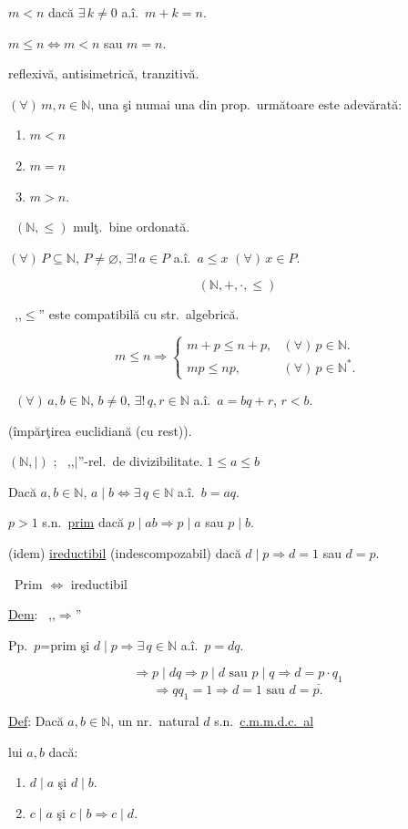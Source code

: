\documentclass[12pt]{article}
\begin{document}
\noindent $m<n$ dacă $\exists\, k\neq 0$ a.î.\ $m+k=n$.

\noindent $m\leq n \Longleftrightarrow m<n$ sau $m=n$.

\noindent reflexivă, antisimetrică, tranzitivă.

\bigskip
\noindent $(\forall)\,m,n\in\mathbb{N}$, una şi numai una din prop.\ următoare este adevărată:

\begin{enumerate}
\item[(1)] $m<n$
\item[(2)] $m=n$
\item[(3)] $m>n$.
\end{enumerate}

\bigskip
\noindent{} \ $(\mathbb{N},\leq)$ mulţ.\ bine ordonată.

\noindent $(\forall)\,P\subseteq\mathbb{N}$, $P\neq\varnothing$, $\exists!\,a\in P$ a.î.\ $a\leq x$ $(\forall)\,x\in P$.

\[
(\mathbb{N},+,\cdot,\leq)
\]

\bigskip
\noindent{} \ ,,$\leq$'' este compatibilă cu str.\ algebrică.

\[
m\leq n \Rightarrow
\begin{cases}
m+p\leq n+p, & (\forall)\,p\in\mathbb{N}.\\
mp\leq np, & (\forall)\,p\in\mathbb{N}^*.
\end{cases}
\]

\bigskip
\noindent{} \ $(\forall)\,a,b\in\mathbb{N}$, $b\neq 0$, $\exists!\,q,r\in\mathbb{N}$ a.î.\ $a=bq+r$, $r<b$.

\noindent (împărţirea euclidiană (cu rest)).

\bigskip
\noindent $(\mathbb{N},\mid)$ ; \ ,,$\mid$''-rel.\ de divizibilitate. \hfill $1\leq a\leq b$

\noindent Dacă $a,b\in\mathbb{N}$, $a\mid b \Leftrightarrow \exists\,q\in\mathbb{N}$ a.î.\ $b=aq$.

\bigskip
\noindent $p>1$ s.n.\ \underline{prim} dacă $p\mid ab \Rightarrow p\mid a$ sau $p\mid b$.

\noindent (idem) \underline{ireductibil} (indescompozabil) dacă $d\mid p \Rightarrow d=1$ sau $d=p$.

\bigskip
\noindent{} \ Prim $\Leftrightarrow$ ireductibil

\bigskip
\noindent\underline{Dem}: \ ,,$\Rightarrow$''

\noindent Pp.\ $p$=prim şi $d\mid p \Rightarrow \exists\,q\in\mathbb{N}$ a.î.\ $p=dq$.

\[
\Rightarrow p\mid dq \Rightarrow p\mid d \text{ sau } p\mid q \Rightarrow \underline{d=p\cdot q_1}
\]
\[
\Rightarrow qq_1=1 \Rightarrow d=1 \text{ sau } d=p.
\]

\bigskip
\noindent\underline{Def}: Dacă $a,b\in\mathbb{N}$, un nr.\ natural $d$ s.n.\ \underline{c.m.m.d.c.\ al}

\noindent lui $a,b$ dacă:

\begin{enumerate}
\item[(1)] $d\mid a$ şi $d\mid b$.
\item[(2)] $c\mid a$ şi $c\mid b \Rightarrow c\mid d$.
\end{enumerate}
\end{document}

